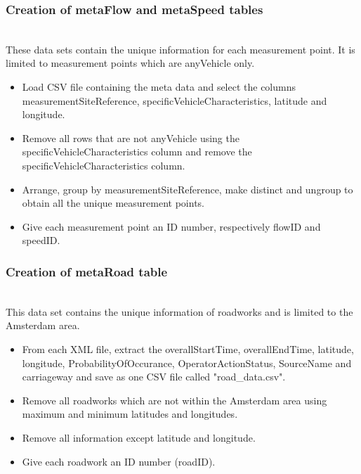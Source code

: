 \documentclass[sigconf]{acmart}
\begin{document}
\subsubsection{Creation of metaFlow and metaSpeed tables}\hspace*{\fill} \\
These data sets contain the unique information for each measurement point. It is limited to measurement points which are anyVehicle only.
\begin{itemize}
    \item Load CSV file containing the meta data and select the columns measurementSiteReference, specificVehicleCharacteristics, latitude and longitude.
    \item Remove all rows that are not anyVehicle using the specificVehicleCharacteristics column and remove the specificVehicleCharacteristics column.
    \item Arrange, group by measurementSiteReference, make distinct and ungroup to obtain all the unique measurement points.
    \item Give each measurement point an ID number, respectively flowID and speedID.
\end{itemize}

\subsubsection{Creation of metaRoad table}\hspace*{\fill} \\
This data set contains the unique information of roadworks and is limited to the Amsterdam area.
\begin{itemize}
    \item From each XML file, extract the overallStartTime, overallEndTime, latitude, longitude, ProbabilityOfOccurance, OperatorActionStatus, SourceName and carriageway and save as one CSV file called "road\_data.csv".
    \item Remove all roadworks which are not within the Amsterdam area using maximum and minimum latitudes and longitudes.
    \item Remove all information except latitude and longitude.
    \item Give each roadwork an ID number (roadID).
\end{itemize}
\end{document}
